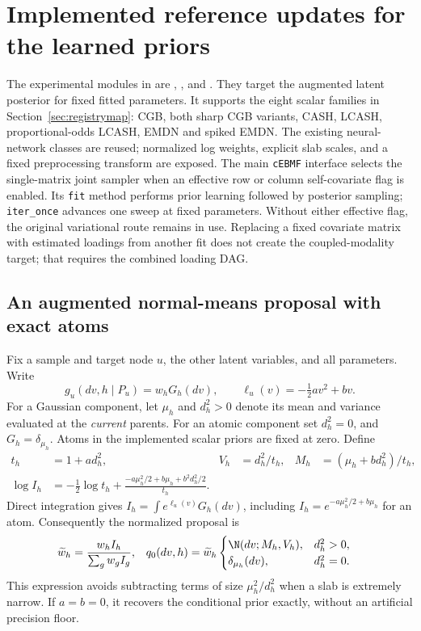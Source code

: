 \section{Implemented reference updates for the learned priors}
\label{sec:implemented}
The experimental modules in  are
, ,  and
. They target the augmented latent
posterior for fixed fitted parameters. It supports the eight scalar
families in Section~\ref{sec:registrymap}: CGB, both sharp CGB variants,
CASH, LCASH, proportional-odds LCASH, EMDN and spiked EMDN.
The existing neural-network classes are reused; normalized log weights,
explicit slab scales, and a fixed preprocessing transform are exposed.
The main \texttt{cEBMF} interface selects the single-matrix joint sampler
when an effective row or column self-covariate flag is enabled. Its
\texttt{fit} method performs prior learning followed by posterior sampling;
\texttt{iter\_once} advances one sweep at fixed parameters. Without either
effective flag, the original variational route remains in use. Replacing
a fixed covariate matrix with estimated loadings from another fit does not
create the coupled-modality target; that requires the combined loading DAG.

\subsection{An augmented normal-means proposal with exact atoms}
Fix a sample and target node \(u\), the other latent variables, and all
parameters. Write
\[
g_u(dv,h\mid P_u)=w_hG_h(dv),\qquad
\ell_u(v)=-\tfrac12av^2+bv.
\]
For a Gaussian component, let \(\mu_h\) and \(d_h^2>0\) denote its mean
and variance evaluated at the \emph{current} parents. For an atomic
component set \(d_h^2=0\), and \(G_h=\delta_{\mu_h}\). Atoms in the
implemented scalar priors are fixed at zero. Define
\begin{align}
t_h&=1+ad_h^2,&
V_h&=d_h^2/t_h,&
M_h&=(\mu_h+bd_h^2)/t_h,\\
\log I_h
&=-\tfrac12\log t_h+
\frac{-a\mu_h^2/2+b\mu_h+b^2d_h^2/2}{t_h}.
\label{eq:stableproposal}
\end{align}
Direct integration gives
\(I_h=\int e^{\ell_u(v)}G_h(dv)\), including
\(I_h=e^{-a\mu_h^2/2+b\mu_h}\) for an atom.
Consequently the normalized proposal is
\begin{align}
\widetilde w_h
&=\frac{w_hI_h}{\sum_gw_gI_g},&
q_0(dv,h)
&=\widetilde w_h
\begin{cases}
\N(dv;M_h,V_h),&d_h^2>0,\\
\delta_{\mu_h}(dv),&d_h^2=0.
\end{cases}
\label{eq:implementedproposal}
\end{align}
This expression avoids subtracting terms of size \(\mu_h^2/d_h^2\)
when a slab is extremely narrow. If \(a=b=0\), it recovers the conditional
prior exactly, without an artificial precision floor.

